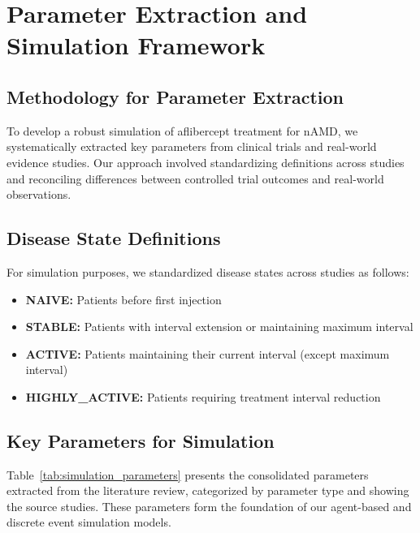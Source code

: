 \section{Parameter Extraction and Simulation Framework}

\subsection{Methodology for Parameter Extraction}

To develop a robust simulation of aflibercept treatment for nAMD, we systematically extracted key parameters from clinical trials and real-world evidence studies. Our approach involved standardizing definitions across studies and reconciling differences between controlled trial outcomes and real-world observations.

\subsection{Disease State Definitions}

For simulation purposes, we standardized disease states across studies as follows:
\begin{itemize}
    \item \textbf{NAIVE:} Patients before first injection
    \item \textbf{STABLE:} Patients with interval extension or maintaining maximum interval
    \item \textbf{ACTIVE:} Patients maintaining their current interval (except maximum interval)
    \item \textbf{HIGHLY\_ACTIVE:} Patients requiring treatment interval reduction
\end{itemize}

\subsection{Key Parameters for Simulation}

Table~\ref{tab:simulation_parameters} presents the consolidated parameters extracted from the literature review, categorized by parameter type and showing the source studies. These parameters form the foundation of our agent-based and discrete event simulation models.

